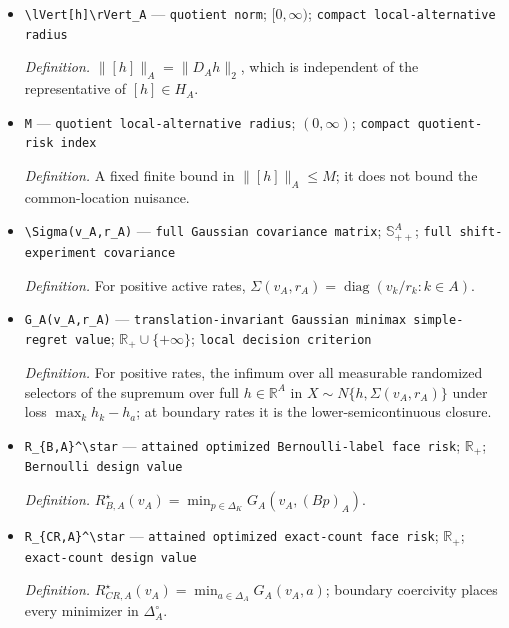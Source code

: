 \documentclass{article}
\begin{document}
\begin{itemize}
  \item \texttt{\textbackslash{}\allowbreak{}lVert[h]\textbackslash{}\allowbreak{}rVert\_\allowbreak{}A} --- \texttt{quotient norm}; \([0,\infty)\); \texttt{compact local-\allowbreak{}alternative radius}
  \par\smallskip\noindent\emph{Definition.} \(\lVert[h]\rVert_A=\lVert D_Ah\rVert_2\), which is independent of the representative of \([h]\in H_A\).
  \item \texttt{M} --- \texttt{quotient local-\allowbreak{}alternative radius}; \((0,\infty)\); \texttt{compact quotient-\allowbreak{}risk index}
  \par\smallskip\noindent\emph{Definition.} A fixed finite bound in \(\lVert[h]\rVert_A\leq M\); it does not bound the common-location nuisance.
  \item \texttt{\textbackslash{}\allowbreak{}Sigma(v\_\allowbreak{}A,\allowbreak{}r\_\allowbreak{}A)} --- \texttt{full Gaussian covariance matrix}; \(\mathbb S_{++}^A\); \texttt{full shift-\allowbreak{}experiment covariance}
  \par\smallskip\noindent\emph{Definition.} For positive active rates, \(\Sigma(v_A,r_A)=\operatorname{diag}(v_k/r_k:k\in A)\).
  \item \texttt{G\_\allowbreak{}A(v\_\allowbreak{}A,\allowbreak{}r\_\allowbreak{}A)} --- \texttt{translation-\allowbreak{}invariant Gaussian minimax simple-\allowbreak{}regret value}; \(\mathbb R_+\cup\{+\infty\}\); \texttt{local decision criterion}
  \par\smallskip\noindent\emph{Definition.} For positive rates, the infimum over all measurable randomized selectors of the supremum over full \(h\in\mathbb R^A\) in \(X\sim N\{h,\Sigma(v_A,r_A)\}\) under loss \(\max_kh_k-h_a\); at boundary rates it is the lower-semicontinuous closure.
  \item \texttt{R\_\allowbreak{}\{B,\allowbreak{}A\}\allowbreak{}\textasciicircum{}\textbackslash{}\allowbreak{}star} --- \texttt{attained optimized Bernoulli-\allowbreak{}label face risk}; \(\mathbb R_+\); \texttt{Bernoulli design value}
  \par\smallskip\noindent\emph{Definition.} \(R_{B,A}^\star(v_A)=\min_{p\in\Delta_K}G_A(v_A,(Bp)_A)\).
  \item \texttt{R\_\allowbreak{}\{CR,\allowbreak{}A\}\allowbreak{}\textasciicircum{}\textbackslash{}\allowbreak{}star} --- \texttt{attained optimized exact-\allowbreak{}count face risk}; \(\mathbb R_+\); \texttt{exact-\allowbreak{}count design value}
  \par\smallskip\noindent\emph{Definition.} \(R_{CR,A}^\star(v_A)=\min_{a\in\Delta_A}G_A(v_A,a)\); boundary coercivity places every minimizer in \(\Delta_A^\circ\).

\end{itemize}
\end{document}
